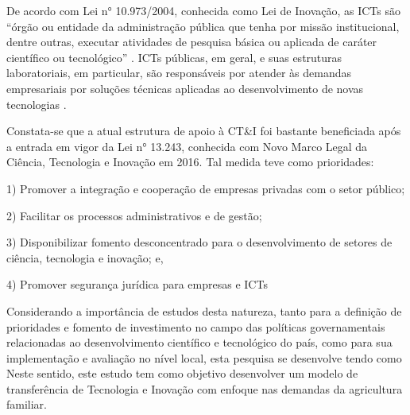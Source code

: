 De acordo com Lei n° 10.973/2004, conhecida como Lei de Inovação, as ICTs são “órgão ou entidade da administração pública que tenha por missão institucional, dentre outras, executar atividades de pesquisa básica ou aplicada de caráter científico ou tecnológico” \cite{brazil_l1097304_2004}. ICTs públicas, em geral, e suas estruturas laboratoriais, em particular, são responsáveis por atender às demandas empresariais por soluções técnicas aplicadas ao desenvolvimento de novas tecnologias \cite{turchi_politicas_2017}.

Constata-se que a atual estrutura de apoio à CT\&I foi bastante beneficiada após a entrada em vigor da Lei n° 13.243, conhecida com Novo Marco Legal da Ciência, Tecnologia e Inovação em 2016. Tal medida teve como prioridades: 

1) Promover a integração e cooperação de empresas privadas com o setor público;

2) Facilitar os processos administrativos e de gestão;

3) Disponibilizar fomento desconcentrado para o desenvolvimento de setores de ciência, tecnologia e inovação; e,

4) Promover segurança jurídica para empresas e ICTs 


Considerando a importância de estudos desta natureza, tanto para a definição de prioridades e fomento de investimento no campo das políticas governamentais relacionadas ao desenvolvimento científico e tecnológico do país, como para sua implementação e avaliação no nível local, esta pesquisa se desenvolve tendo como Neste sentido, este estudo tem como objetivo desenvolver um modelo de transferência de Tecnologia e Inovação com enfoque nas demandas da agricultura familiar. 




